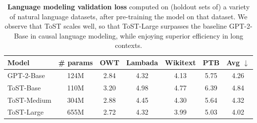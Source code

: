\documentclass[../../book-main.tex]{subfiles}
\begin{document}
\begin{table}
    \centering 
    \begin{tabular}{@{}lcccccc@{}}
        \toprule
        Model & \# params & OWT & Lambada & Wikitext & PTB & Avg $\downarrow$ \\ \midrule
        GPT-2-Base & 124M & 2.84 & 4.32 & 4.13 & 5.75 & 4.26 \\
        ToST-Base & 110M & 3.20 & 4.98 & 4.77 & 6.39 & 4.84 \\
        ToST-Medium & 304M & 2.88 & 4.45 & 4.30 & 5.64 & 4.32 \\
        ToST-Large & 655M & 2.72 & 4.32 & 3.99 & 5.03 & 4.02 \\ \bottomrule
    \end{tabular}%
    \caption{\small\textbf{Language modeling validation loss} computed on (holdout sets of) a variety of natural language datasets, after pre-training the model on that dataset. We observe that ToST scales well, so that ToST-Large surpasses the baseline GPT-2-Base in causal language modeling, while enjoying superior efficiency in long contexts.}
    \label{tab:tost_lm}
\end{table}
\end{document}

